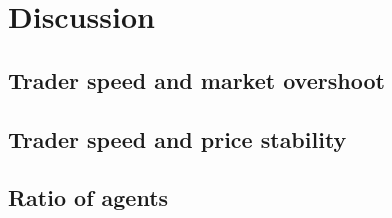 \chapter{Discussion}\label{chapter:discussion}

\section{Trader speed and market overshoot}

\section{Trader speed and price stability}

\section{Ratio of agents}


